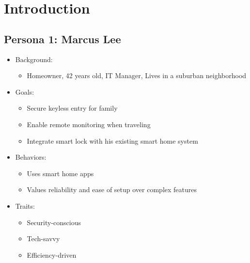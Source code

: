 \newpage
\section{Introduction}

\subsection*{Persona 1: Marcus Lee}

\begin{itemize}
    \item Background: 
    \begin{itemize}
        \item Homeowner, 42 years old, IT Manager, Lives in a suburban neighborhood
    \end{itemize}

    \item Goals:
    \begin{itemize}
        \item Secure keyless entry for family
        \item Enable remote monitoring when traveling
        \item Integrate smart lock with his existing smart home system
    \end{itemize}

    \item Behaviors:
    \begin{itemize}
        \item Uses smart home apps
        \item Values reliability and ease of setup over complex features
    \end{itemize}

    \item Traits:
    \begin{itemize}
        \item Security-conscious
        \item Tech-savvy
        \item Efficiency-driven
    \end{itemize}
\end{itemize}

